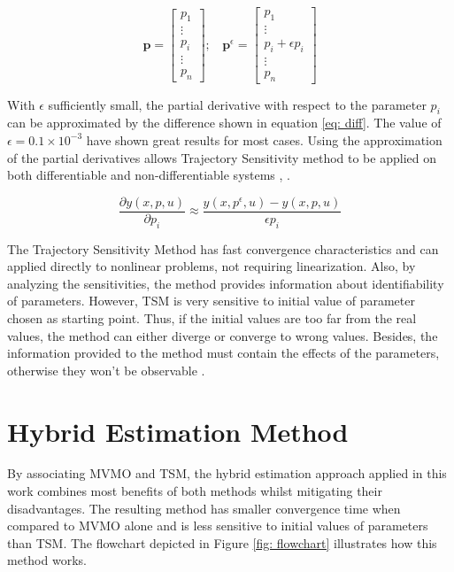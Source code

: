 \begin{equation}
	\mathbf{p} = 
	\begin{bmatrix}
		p_{1} \\
		\vdots \\
		p_{i} \\
		\vdots \\
		p_{n}
	\end{bmatrix}; \ \ \ \ 
	\mathbf{p}^{\epsilon} =
	\begin{bmatrix}
		p_{1} \\
		\vdots \\
		p_{i} + \epsilon p_{i} \\
		\vdots \\
		p_{n}
	\end{bmatrix}
	\label{eq: pvecs}
\end{equation}

With $\epsilon$ sufficiently small, the partial derivative with respect to the parameter $p_{i}$ can be approximated by the difference shown in equation \eqref{eq: diff}. The value of $\epsilon = 0.1 \times 10^{-3}$ have shown great results for most cases. Using the approximation of the partial derivatives allows Trajectory Sensitivity method to be applied on both differentiable and non-differentiable systems \cite{Benchluch1993}, \cite{Cari2006}.

\begin{equation}
	\frac{\partial y(x, p, u)}{\partial p_{i}} \approx \frac{y(x, p^{\epsilon}, u) - y(x, p, u)}{\epsilon p_{i}}
	\label{eq: diff}
\end{equation}

The Trajectory Sensitivity Method has fast convergence characteristics and can applied directly to nonlinear problems, not requiring linearization. Also, by analyzing the sensitivities, the method provides information about identifiability of parameters. However, TSM is very sensitive to initial value of parameter chosen as starting point. Thus, if the initial values are too far from the real values, the method can either diverge or converge to wrong values. Besides, the information provided to the method must contain the effects of the parameters, otherwise they won't be observable \cite{Benchluch1993}.

\section{Hybrid Estimation Method}
\label{sec: Hybrid_Method}

By associating MVMO and TSM, the hybrid estimation approach applied in this work combines most benefits of both methods whilst mitigating their disadvantages. The resulting method has smaller convergence time when compared to MVMO alone and is less sensitive to initial values of parameters than TSM. The flowchart depicted in Figure \ref{fig: flowchart} illustrates how this method works.

